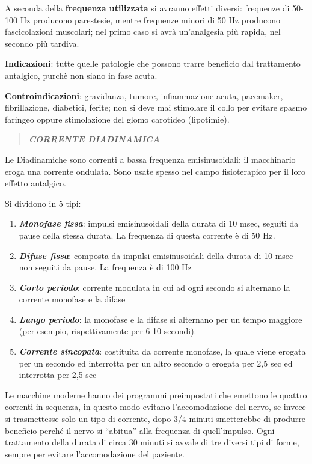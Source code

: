 \documentclass[]{article}
\begin{document}
A seconda della \textbf{frequenza utilizzata} si avranno effetti
diversi: frequenze di 50-100 Hz producono parestesie, mentre frequenze
minori di 50 Hz producono fascicolazioni muscolari; nel primo caso si
avrà un'analgesia più rapida, nel secondo più tardiva.

\textbf{Indicazioni}: tutte quelle patologie che possono trarre
beneficio dal trattamento antalgico, purchè non siano in fase acuta.

\textbf{Controindicazioni}: gravidanza, tumore, infiammazione acuta,
pacemaker, fibrillazione, diabetici, ferite; non si deve mai stimolare
il collo per evitare spasmo faringeo oppure stimolazione del glomo
carotideo (lipotimie).

\begin{quote}
\textbf{\emph{CORRENTE DIADINAMICA}}
\end{quote}

Le Diadinamiche sono correnti a bassa frequenza emisinusoidali: il
macchinario eroga una corrente ondulata. Sono usate spesso nel campo
fisioterapico per il loro effetto antalgico.

Si dividono in 5 tipi:

\begin{enumerate}
\def\labelenumi{\arabic{enumi}.}
\item
  \textbf{\emph{Monofase fissa}}: impulsi emisinusoidali della durata di
  10 msec, seguiti da pause della stessa durata. La frequenza di questa
  corrente è di 50 Hz.
\item
  \textbf{\emph{Difase fissa}}: composta da impulsi emisinusoidali della
  durata di 10 msec non seguiti da pause. La frequenza è di 100 Hz
\item
  \textbf{\emph{Corto periodo}}: corrente modulata in cui ad ogni
  secondo si alternano la corrente monofase e la difase
\item
  \textbf{\emph{Lungo periodo}}: la monofase e la difase si alternano
  per un tempo maggiore (per esempio, rispettivamente per 6-10 secondi).
\item
  \textbf{\emph{Corrente sincopata}}: costituita da corrente monofase,
  la quale viene erogata per un secondo ed interrotta per un altro
  secondo o erogata per 2,5 sec ed interrotta per 2,5 sec
\end{enumerate}

Le macchine moderne hanno dei programmi preimpostati che emettono le
quattro correnti in sequenza, in questo modo evitano l'accomodazione del
nervo, se invece si trasmettesse solo un tipo di corrente, dopo 3/4
minuti smetterebbe di produrre beneficio perché il nervo si ``abitua''
alla frequenza di quell'impulso. Ogni trattamento della durata di circa
30 minuti si avvale di tre diversi tipi di forme, sempre per evitare
l'accomodazione del paziente.
\end{document}
